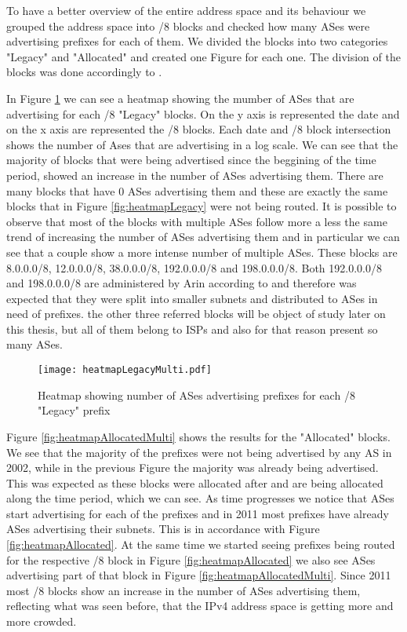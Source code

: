\documentclass[11pt,a4paper]{scrreprt}
\begin{document}
To have a better overview of the entire address space and its behaviour we grouped the address space into /8 blocks and checked how many ASes were advertising prefixes for each of them. We divided the blocks into two categories "Legacy" and "Allocated" and created one Figure for each one. The division of the blocks was done accordingly to \cite{IANA_Address_Space}.

In Figure \ref{fig:heatmapLegacyMulti} we can see a heatmap showing the mumber of ASes that are advertising for each /8 "Legacy" blocks. On the y axis is represented the date and on the x axis are represented the /8 blocks. Each date and /8 block intersection shows the number of Ases that are advertising in a log scale. 
We can see that the majority of blocks that were being advertised since the beggining of the time period, showed an increase in the number of ASes advertising them. There are many blocks that have 0 ASes advertising them and these are exactly the same blocks that in Figure \ref{fig:heatmapLegacy} were not being routed. It is possible to observe that most of the blocks with multiple ASes follow more a less the same trend of increasing the number of ASes advertising them and in particular we can see that a couple show a more intense number of multiple ASes. These blocks are 8.0.0.0/8, 12.0.0.0/8, 38.0.0.0/8, 192.0.0.0/8 and 198.0.0.0/8. Both 192.0.0.0/8 and 198.0.0.0/8 are administered by Arin according to \cite{IANA_Address_Space} and therefore was expected that they were split into smaller subnets and distributed to ASes in need of prefixes. the other three referred blocks will be object of study later on this thesis, but all of them belong to ISPs and also for that reason present so many ASes.

\begin{figure}[!h]
\centering
\texttt{[image: heatmapLegacyMulti.pdf]}
\caption{Heatmap showing number of ASes advertising prefixes for each /8 "Legacy" prefix}
\label{fig:heatmapLegacyMulti}
\end{figure}

Figure \ref{fig:heatmapAllocatedMulti} shows the results for the "Allocated" blocks. 
We see that the majority of the prefixes were not being advertised by any AS in 2002, while in the previous Figure the majority was already being advertised. This was expected as these blocks were allocated after and are being allocated along the time period, which we can see. As time progresses we notice that ASes start advertising for each of the prefixes and in 2011 most prefixes have already ASes advertising their subnets. This is in accordance with Figure \ref{fig:heatmapAllocated}. At the same time we started seeing prefixes being routed for the respective /8 block in Figure \ref{fig:heatmapAllocated} we also see ASes advertising part of that block in Figure \ref{fig:heatmapAllocatedMulti}. Since 2011 most /8 blocks show an increase in the number of ASes advertising them, reflecting what was seen before, that the IPv4 address space is getting more and more crowded.
\end{document}
